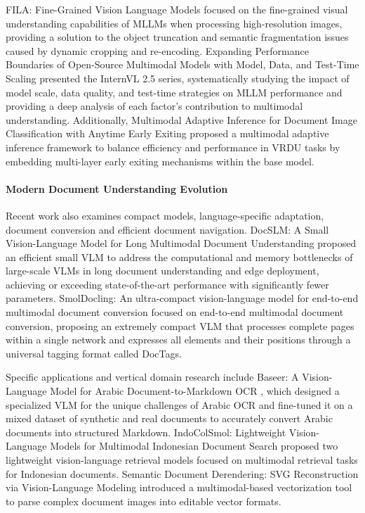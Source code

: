 FILA: Fine-Grained Vision Language Models \cite{liu2024fila} focused on the fine-grained visual understanding capabilities of MLLMs when processing high-resolution images, providing a solution to the object truncation and semantic fragmentation issues caused by dynamic cropping and re-encoding. Expanding Performance Boundaries of Open-Source Multimodal Models with Model, Data, and Test-Time Scaling \cite{chen2024internvl25} presented the InternVL 2.5 series, systematically studying the impact of model scale, data quality, and test-time strategies on MLLM performance and providing a deep analysis of each factor's contribution to multimodal understanding. Additionally, Multimodal Adaptive Inference for Document Image Classification with Anytime Early Exiting \cite{sun2024anytime} proposed a multimodal adaptive inference framework to balance efficiency and performance in VRDU tasks by embedding multi-layer early exiting mechanisms within the base model.

\paragraph{Modern Document Understanding Evolution}
Recent work also examines compact models, language-specific adaptation, document conversion and efficient document navigation. DocSLM: A Small Vision-Language Model for Long Multimodal Document Understanding \cite{wang2025docslm} proposed an efficient small VLM to address the computational and memory bottlenecks of large-scale VLMs in long document understanding and edge deployment, achieving or exceeding state-of-the-art performance with significantly fewer parameters. SmolDocling: An ultra-compact vision-language model for end-to-end multimodal document conversion \cite{kim2025smoldocling} focused on end-to-end multimodal document conversion, proposing an extremely compact VLM that processes complete pages within a single network and expresses all elements and their positions through a universal tagging format called DocTags.

Specific applications and vertical domain research include Baseer: A Vision-Language Model for Arabic Document-to-Markdown OCR \cite{albaseer2025baseer}, which designed a specialized VLM for the unique challenges of Arabic OCR and fine-tuned it on a mixed dataset of synthetic and real documents to accurately convert Arabic documents into structured Markdown. IndoColSmol: Lightweight Vision-Language Models for Multimodal Indonesian Document Search \cite{rahman2025indocolsmol} proposed two lightweight vision-language retrieval models focused on multimodal retrieval tasks for Indonesian documents. Semantic Document Derendering: SVG Reconstruction via Vision-Language Modeling \cite{kim2025derendering} introduced a multimodal-based vectorization tool to parse complex document images into editable vector formats.

